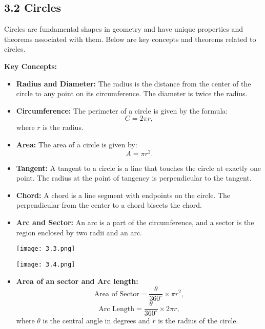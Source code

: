 
\subsection*{3.2 Circles}
Circles are fundamental shapes in geometry and have unique properties and theorems associated with them. Below are key concepts and theorems related to circles.

\textbf{Key Concepts:}
\begin{itemize}
	\item \textbf{Radius and Diameter:} The radius is the distance from the center of the circle to any point on its circumference. The diameter is twice the radius.
	\item \textbf{Circumference:} The perimeter of a circle is given by the formula:
	\[
	C = 2\pi r,
	\]
	where $r$ is the radius.
	\item \textbf{Area:} The area of a circle is given by:
	\[
	A = \pi r^2.
	\]
	\item \textbf{Tangent:} A tangent to a circle is a line that touches the circle at exactly one point. The radius at the point of tangency is perpendicular to the tangent.
	\item \textbf{Chord:} A chord is a line segment with endpoints on the circle. The perpendicular from the center to a chord bisects the chord.
	\item \textbf{Arc and Sector:} An arc is a part of the circumference, and a sector is the region enclosed by two radii and an arc.
	\begin{center}
		\texttt{[image: 3.3.png]}
	\end{center}
	\begin{center}
		\texttt{[image: 3.4.png]}
	\end{center}
	\item \textbf{Area of an sector and Arc length:} 
	\[
	\text{Area of Sector} = \frac{\theta}{360^\circ} \times \pi r^2,
	\]
	\[
	\text{Arc Length} = \frac{\theta}{360^\circ} \times 2\pi r,
	\]
	where $\theta$ is the central angle in degrees and $r$ is the radius of the circle.
	
\end{itemize}

